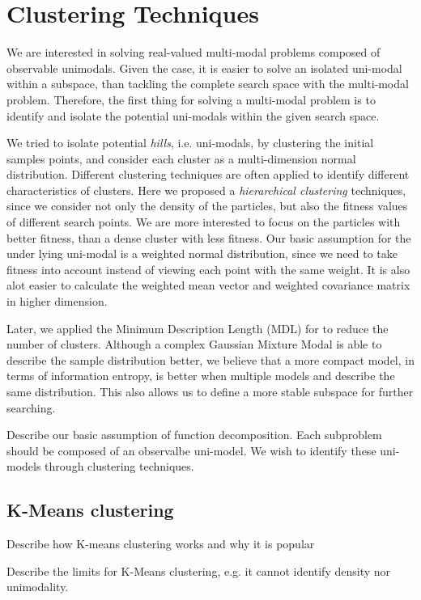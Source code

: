 \chapter{Clustering Techniques}
\label{chapter:clustering}

We are interested in solving real-valued multi-modal problems composed of observable unimodals.
Given the case, it is easier to solve an isolated uni-modal within a subspace,
than tackling the complete search space with the multi-modal problem.
Therefore, the first thing for solving a multi-modal problem is to identify and isolate 
the potential uni-modals within the given search space.

We tried to isolate potential \textit{hills}, i.e. uni-modals, by clustering the initial samples points,
and consider each cluster as a multi-dimension normal distribution.
Different clustering techniques are often applied to identify different characteristics of clusters.
Here we proposed a \textit{hierarchical clustering} techniques,
since we consider not only the density of the particles, 
but also the fitness values of different search points.
We are more interested to focus on the particles with better fitness,
than a dense cluster with less fitness. 
Our basic assumption for the under lying uni-modal is a weighted normal distribution, 
since we need to take fitness into account instead of viewing each point with the same weight.
It is also alot easier to calculate the weighted mean vector and weighted covariance matrix in higher dimension. 

Later, we applied the Minimum Description Length (MDL) for to reduce the number of clusters.
Although a complex Gaussian Mixture Modal is able to describe the sample distribution better,
we believe that a more compact model, in terms of information entropy, is better when multiple models and describe the same distribution. 
This also allows us to define a more stable subspace for further searching.


Describe our basic assumption of function decomposition.
Each subproblem should be composed of an observalbe uni-model.
We wish to identify these uni-models through clustering techniques. 

\section{K-Means clustering}
Describe how K-means clustering works and why it is popular

Describe the limits for K-Means clustering, e.g. it cannot identify density nor unimodality. 

